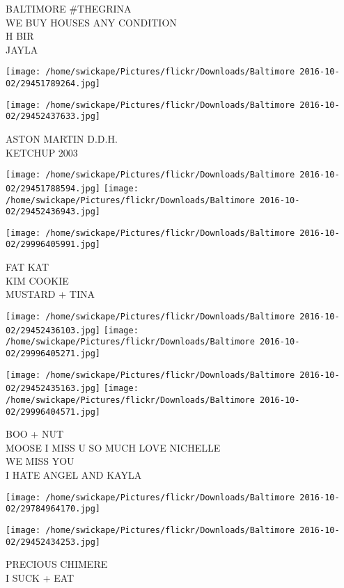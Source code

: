 \documentclass[10pt,letterpaper]{article}
\begin{document}
BALTIMORE \#THEGRINA\\
WE BUY HOUSES ANY CONDITION\\
H BIR\\
JAYLA
\pagebreak

\texttt{[image: /home/swickape/Pictures/flickr/Downloads/Baltimore 2016-10-02/29451789264.jpg]}

\vspace{0.25in}
\texttt{[image: /home/swickape/Pictures/flickr/Downloads/Baltimore 2016-10-02/29452437633.jpg]}

ASTON MARTIN D.D.H.\\
KETCHUP 2003
\pagebreak

\texttt{[image: /home/swickape/Pictures/flickr/Downloads/Baltimore 2016-10-02/29451788594.jpg]}
\texttt{[image: /home/swickape/Pictures/flickr/Downloads/Baltimore 2016-10-02/29452436943.jpg]}

\vspace{0.25in}
\texttt{[image: /home/swickape/Pictures/flickr/Downloads/Baltimore 2016-10-02/29996405991.jpg]}

FAT KAT\\
KIM COOKIE\\
MUSTARD + TINA
\pagebreak

\texttt{[image: /home/swickape/Pictures/flickr/Downloads/Baltimore 2016-10-02/29452436103.jpg]}
\texttt{[image: /home/swickape/Pictures/flickr/Downloads/Baltimore 2016-10-02/29996405271.jpg]}

\texttt{[image: /home/swickape/Pictures/flickr/Downloads/Baltimore 2016-10-02/29452435163.jpg]}
\texttt{[image: /home/swickape/Pictures/flickr/Downloads/Baltimore 2016-10-02/29996404571.jpg]}

BOO + NUT\\
MOOSE I MISS U SO MUCH LOVE NICHELLE\\
WE MISS YOU\\
I HATE ANGEL AND KAYLA
\pagebreak

\texttt{[image: /home/swickape/Pictures/flickr/Downloads/Baltimore 2016-10-02/29784964170.jpg]}

\vspace{0.25in}
\texttt{[image: /home/swickape/Pictures/flickr/Downloads/Baltimore 2016-10-02/29452434253.jpg]}

PRECIOUS CHIMERE\\
I SUCK + EAT
\pagebreak
\end{document}
